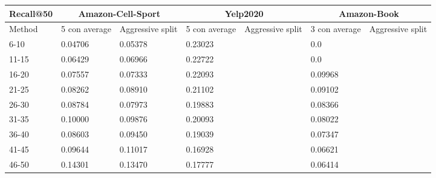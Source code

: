 \begin{table*}[h!]
    \centering
    \begin{tabular}{|l|l|l||l|l||l|l|}
        \hline
        Recall@50 & \multicolumn{2}{c||}{Amazon-Cell-Sport} & \multicolumn{2}{c||}{Yelp2020} & \multicolumn{2}{c|}{Amazon-Book}                                                       \\ \hline
        Method    & 5 con average                           & Aggressive split               & 5 con average                    & Aggressive split & 3 con average & Aggressive split \\ \hline
        6-10      & 0.04706                                 & 0.05378                        & 0.23023                          &                  & 0.0           &                  \\ \hline
        11-15     & 0.06429                                 & 0.06966                        & 0.22722                          &                  & 0.0           &                  \\ \hline
        16-20     & 0.07557                                 & 0.07333                        & 0.22093                          &                  & 0.09968       &                  \\ \hline
        21-25     & 0.08262                                 & 0.08910                        & 0.21102                          &                  & 0.09102       &                  \\ \hline
        26-30     & 0.08784                                 & 0.07973                        & 0.19883                          &                  & 0.08366       &                  \\ \hline
        31-35     & 0.10000                                 & 0.09876                        & 0.20093                          &                  & 0.08022       &                  \\ \hline
        36-40     & 0.08603                                 & 0.09450                        & 0.19039                          &                  & 0.07347       &                  \\ \hline
        41-45     & 0.09644                                 & 0.11017                        & 0.16928                          &                  & 0.06621       &                  \\ \hline
        46-50     & 0.14301                                 & 0.13470                        & 0.17777                          &                  & 0.06414       &                  \\ \hline

\end{tabular}
\end{table*}
